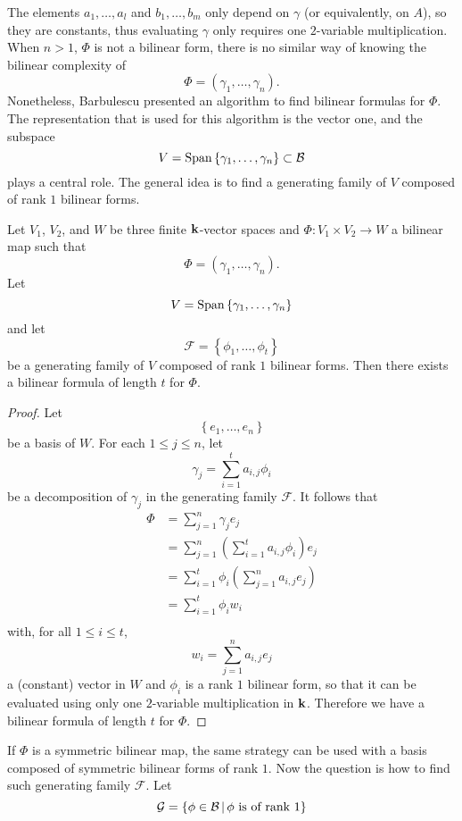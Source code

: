The elements $a_1, \dots, a_l$ and $b_1, \dots, b_m$ only depend on $\gamma$ (or
equivalently, on $A$), so they are constants, thus evaluating $\gamma$ only
requires one $2$-variable multiplication.
When $n>1$, \ie $\Phi$ is not a
bilinear form, there is no similar way of knowing the bilinear complexity of
\[
  \Phi = (\gamma_1, \dots, \gamma_n).
\]
Nonetheless, Barbulescu \etal presented an algorithm to find bilinear formulas
for $\Phi$. The representation that is used for this algorithm is the vector
one, and the subspace
\[
  V = \operatorname{Span}\left\{ \gamma_1, \dots, \gamma_n \right\}\subset\mathcal{B}
\]
plays a central role. The general idea is to find a generating family of $V$ composed of
rank $1$ bilinear forms.
\begin{prop}
  Let $V_1$, $V_2$, and $W$ be three finite $\mathbf{k}$-vector spaces and $\Phi:V_1\times
  V_2\to W$ a bilinear map such that
  \[
    \Phi = (\gamma_1, \dots, \gamma_n).
  \]
  Let 
  \[
    V = \operatorname{Span}\left\{ \gamma_1, \dots, \gamma_n \right\}
  \]
  and let 
  \[
    \mathcal F = \left\{ \phi_1, \dots, \phi_t \right\}
  \]
  be a generating family of $V$ composed of rank $1$ bilinear forms. Then there
  exists a bilinear formula of length $t$ for $\Phi$.
\end{prop}
\begin{proof}
 Let 
 \[
   \left\{ e_1, \dots, e_n \right\}
 \]
 be a basis of $W$.  For each $1\leq j \leq n$, let
 \[
   \gamma_j = \sum_{i=1}^t a_{i, j} \phi_i
 \]
 be a decomposition of $\gamma_j$ in the generating family $\mathcal F$.
 It follows that
 \begin{align*}
   \Phi &= \sum_{j=1}^n\gamma_j e_j \\
   &= \sum_{j=1}^n (\sum_{i=1}^ta_{i, j}\phi_i)e_j\\
   &= \sum_{i=1}^t \phi_i (\sum_{j=1}^n a_{i, j}e_j)\\
   &= \sum_{i=1}^t \phi_i w_i\\
 \end{align*}
 with, for all $1\leq i\leq t$,
\[
  w_i = \sum_{j=1}^n a_{i, j}e_j
\]
a (constant) vector in $W$ and $\phi_i$ is a rank $1$ bilinear form, so that
it can be evaluated using only one $2$-variable multiplication in $\mathbf{k}$. Therefore
we have a bilinear formula of length $t$ for $\Phi$.
\end{proof}
If $\Phi$ is a symmetric bilinear map, the same strategy can be used with a
basis composed of symmetric bilinear forms of rank $1$. Now the question is how
to find such generating family $\mathcal F$. Let 
\[
  \mathcal{G} = \left\{ \phi\in\mathcal{B}\,|\,\phi\text{ is of rank }1 \right\}
\]
